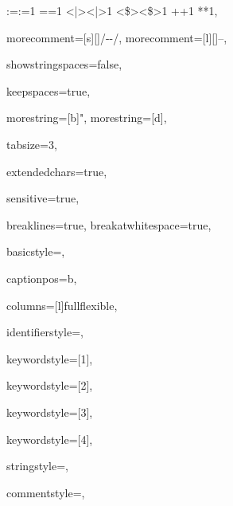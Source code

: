 {{:=}{{\color{symbolcolor}:=}}1
{=}{{\color{symbolcolor}=}}1
{<|>}{{\color{symbolcolor}<|>}}1
{<\$>}{{\color{symbolcolor}<\$>}}1
{+}{{\color{symbolcolor}+}}1
{*}{{\color{symbolcolor}*}}1,

morecomment=[s][\color{commentcolor}]{/-}{-/},
morecomment=[l][\color{commentcolor}]{--},

showstringspaces=false,

keepspaces=true,

morestring=[b]",
morestring=[d],

tabsize=3,

extendedchars=true,

sensitive=true,

breaklines=true,
breakatwhitespace=true,

basicstyle=\ttfamily\small,

captionpos=b,

columns=[l]fullflexible,


identifierstyle={\ttfamily\color{black}},

keywordstyle=[1]{\ttfamily\color{keywordcolor}},

keywordstyle=[2]{\ttfamily\color{sortcolor}},

keywordstyle=[3]{\ttfamily\color{tacticcolor}},

keywordstyle=[4]{\ttfamily\color{attributecolor}},


stringstyle={\ttfamily\color{symbolcolor}},

commentstyle={\ttfamily\footnotesize },

}